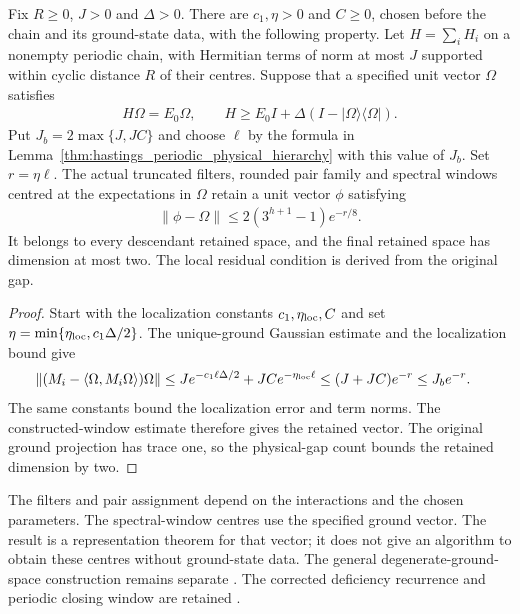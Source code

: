 \begin{lemma}
    \label{thm:hastings_periodic_unique_ground_hierarchy}
    \leanok
    Fix $R\ge0$, $J>0$ and $\Delta>0$. There are $c_1,\eta>0$ and
    $C\ge0$, chosen before the chain and its ground-state data, with the
    following property. Let $H=\sum_iH_i$ on a nonempty periodic chain,
    with Hermitian terms of norm at most $J$ supported within cyclic
    distance $R$ of their centres. Suppose that a specified unit vector
    $\Omega$ satisfies
    \begin{align*}
        H\Omega=E_0\Omega,\qquad
        H\ge E_0I+\Delta(I-|\Omega\rangle\langle\Omega|).
    \end{align*}
    Put $J_b=2\max\{J,JC\}$ and choose $\ell$ by the formula in
    Lemma~\ref{thm:hastings_periodic_physical_hierarchy} with this
    value of $J_b$. Set $r=\eta\ell$.
    The actual truncated filters, rounded pair family and spectral
    windows centred at the expectations in $\Omega$ retain a unit
    vector $\phi$ satisfying
    \begin{align*}
        \|\phi-\Omega\|\le2(3^{h+1}-1)e^{-r/8}.
    \end{align*}
    It belongs to every descendant retained space, and the final
    retained space has dimension at most two. The local residual
    condition is derived from the original gap.
\end{lemma}
\begin{proof}\leanok
    Start with the localization constants $c_1,\eta_{\rm loc},C$ and
    set $\eta=\min\{\eta_{\rm loc},c_1\Delta/2\}$. The unique-ground
    Gaussian estimate and the localization bound give
    \begin{align*}
        \|(M_i-\langle\Omega,M_i\Omega\rangle)\Omega\|
         & \le J e^{-c_1\ell\Delta/2}+JC e^{-\eta_{\rm loc}\ell}
        \le (J+JC)e^{-r}\le J_b e^{-r}.
    \end{align*}
    The same constants bound the localization error and term norms.
    The constructed-window estimate therefore gives the retained
    vector. The original ground projection has trace one, so the
    physical-gap count bounds the retained dimension by two.
\end{proof}

The filters and pair assignment depend on the interactions and the chosen
parameters. The spectral-window centres use the specified ground vector.
The result is a representation theorem for that vector; it does not give
an algorithm to obtain these centres without ground-state data. The
general degenerate-ground-space construction remains separate
\cite{gap:hastings05_two_dim_ground_basis}. The corrected deficiency
recurrence and periodic closing window are retained
\cite{gap:hastings05_hierarchical_projection,gap:hastings05_hierarchical_energy}.

